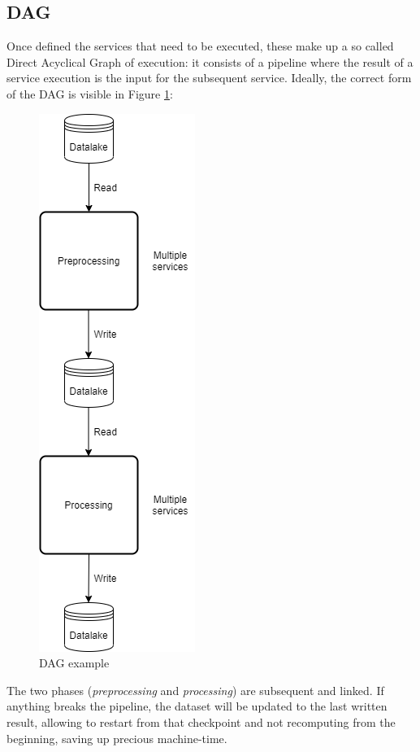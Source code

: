 \documentclass[\main/main.tex]{subfiles}
\begin{document}
\subsection{DAG}
Once defined the services that need to be executed, these make up a so called Direct Acyclical Graph of execution: it consists of a pipeline where the result of a service execution is the input for the subsequent service. Ideally, the correct form of the DAG is visible in Figure \ref{fig:dag_example}:
\begin{figure}[H]
    \centering
    \includegraphics[scale=0.5]{images/architecture/dag_theory.png}
    \caption{DAG example}
    \label{fig:dag_example}
\end{figure}
The two phases (\emph{preprocessing} and \emph{processing}) are subsequent and linked. If anything breaks the pipeline, the dataset will be updated to the last written result, allowing to restart from that checkpoint and not recomputing from the beginning, saving up precious machine-time.
\end{document}
